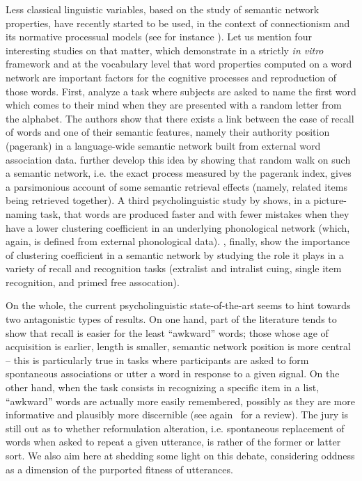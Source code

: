 Less classical linguistic variables, based on the study of semantic network properties, have recently started to be used, in the context of connectionism and its normative processual models (see for instance \citet{collins1975spreading}).
Let us mention four interesting studies on that matter, which demonstrate in a strictly \emph{in vitro} framework and at the vocabulary level that word properties computed on a word network are important factors for the cognitive processes and reproduction of those words.
First, \citet{Griffiths07} analyze a task where subjects are asked to name the first word which comes to their mind when they are presented with a random letter from the %
alphabet. The authors show that there exists a link between the ease of recall of words and one of their semantic features, namely their authority position (pagerank) in a language-wide semantic network built from external word association data.
\citet{austerweil2012human} further develop this idea by showing that random walk on such a semantic network, i.e. the exact process measured by the pagerank index, gives a parsimonious account of some semantic retrieval effects (namely, related items being retrieved together).
A third psycholinguistic study by \citet{Chan10} shows, in a picture-naming task, that words are produced faster and with fewer mistakes when they have a lower clustering coefficient in an underlying phonological network (which, again, is  defined from external phonological data).
\citet{nelson2013activation}, finally, show the importance of clustering coefficient in a semantic network by studying the role it plays in a variety of recall and recognition tasks (extralist and intralist cuing, single item recognition, and primed free assocation).

On the whole, the current psycholinguistic state-of-the-art seems to hint towards two antagonistic types of results.
On one hand, part of the literature tends to show that recall is easier for the least ``awkward'' words; those whose age of acquisition is earlier, length is smaller, semantic network position is more central -- this is particularly true in tasks where participants are asked to form spontaneous associations or utter a word in response to a given signal.
On the other hand, when the task consists in recognizing a specific item in a list, ``awkward'' words are actually more easily remembered, possibly as they are more informative and plausibly more discernible (see again~\citet{Yonelinas02} for a review).
The jury is still out as to whether reformulation alteration, i.e. spontaneous replacement of words when asked to repeat a given utterance, is rather of the former or latter sort.
We also aim here at shedding some light on this debate, considering oddness as a dimension of the purported fitness of utterances.
